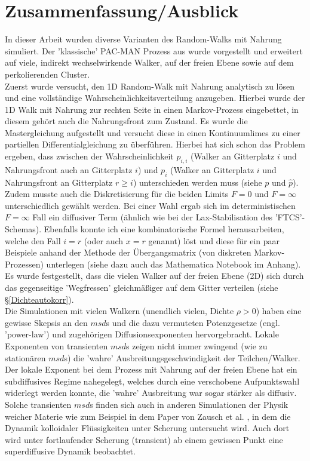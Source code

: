 \documentclass[a4paper, 12pt]{report}
\begin{document}
\chapter{Zusammenfassung/Ausblick}
In dieser Arbeit wurden diverse Varianten des Random-Walks mit Nahrung simuliert. Der 'klassische' PAC-MAN Prozess aus \cite{doi:10.1063/1.4999485} wurde vorgestellt und erweitert auf viele, indirekt wechselwirkende Walker, auf der freien Ebene sowie auf dem perkolierenden Cluster.
\\
Zuerst wurde versucht, den 1D Random-Walk mit Nahrung analytisch zu lösen und eine vollständige Wahrscheinlichkeitsverteilung anzugeben. Hierbei wurde der 1D Walk mit Nahrung zur rechten Seite in einen Markov-Prozess eingebettet, in diesem gehört auch die Nahrungsfront zum Zustand. Es wurde die Mastergleichung aufgestellt und versucht diese in einen Kontinuumlimes zu einer partiellen Differentialgleichung zu überführen. Hierbei hat sich schon das Problem ergeben, dass zwischen der Wahrscheinlichkeit $p_{i,i}$ (Walker an Gitterplatz $i$ und Nahrungsfront auch an Gitterplatz $i$) und $p_i$ (Walker an Gitterplatz $i$ und Nahrungsfront an Gitterplatz $r \geq i$) unterschieden werden muss (siehe $p$ und $\hat{p}$). Zudem musste auch die Diskretisierung für die beiden Limits $F=0$ und $F=\infty$ unterschiedlich gewählt werden. Bei einer Wahl ergab sich im deterministischen $F=\infty$ Fall ein diffusiver Term (ähnlich wie bei der Lax-Stabilisation des 'FTCS'-Schemas). Ebenfalls konnte ich eine kombinatorische Formel herausarbeiten, welche den Fall $i=r$ (oder auch $x=r$ genannt) löst und diese für ein paar Beispiele anhand der Methode der Übergangsmatrix (von diskreten Markov-Prozessen) unterlegen (siehe dazu auch das Mathematica Notebook im Anhang).
\\
Es wurde festgestellt, dass die vielen Walker auf der freien Ebene (2D) sich durch das gegenseitige 'Wegfressen' gleichmäßiger auf dem Gitter verteilen (siehe §\ref{Dichteautokorr}).
\\
Die Simulationen mit vielen Walkern (unendlich vielen, Dichte $\rho > 0$) haben eine gewisse Skepsis an den $msd$s und die dazu vermuteten Potenzgesetze (engl. 'power-law') und zugehörigen Diffusionsexponenten hervorgebracht. Lokale Exponenten von transienten $msd$s zeigen nicht immer zwingend (wie zu stationären $msd$s) die 'wahre' Ausbreitungsgeschwindigkeit der Teilchen/Walker. Der lokale Exponent bei dem Prozess mit Nahrung auf der freien Ebene hat ein subdiffusives Regime nahegelegt, welches durch eine verschobene Aufpunktswahl widerlegt werden konnte, die 'wahre' Ausbreitung war sogar stärker als diffusiv.
\\
Solche transienten $msd$s finden sich auch in anderen Simulationen der Physik weicher Materie wie zum Beispiel in dem Paper von Zausch et al. \cite{Zausch_2008}, in dem die Dynamik kolloidaler Flüssigkeiten unter Scherung untersucht wird. Auch dort wird unter fortlaufender Scherung (transient) ab einem gewissen Punkt eine superdiffusive Dynamik beobachtet.
\end{document}
